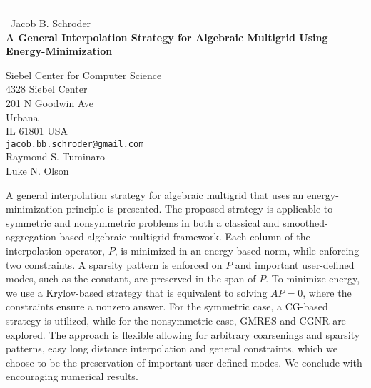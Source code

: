 \documentclass{report}
\begin{document}
\begin{center}
\rule{6in}{1pt} \
{\large Jacob B. Schroder \\
{\bf A General Interpolation Strategy for Algebraic Multigrid Using Energy-Minimization}}

Siebel Center for Computer Science \\ 4328 Siebel Center \\ 201 N Goodwin Ave \\ Urbana \\ IL 61801 USA
\\
{\tt jacob.bb.schroder@gmail.com}\\
Raymond S. Tuminaro\\
Luke N. Olson\end{center}

A general interpolation strategy for algebraic multigrid that uses an
energy-minimization principle is presented. The proposed strategy is
applicable to symmetric and nonsymmetric problems in both a classical and
smoothed-aggregation-based algebraic multigrid framework. Each column of
the interpolation operator, $P$, is minimized in an energy-based norm,
while enforcing two constraints. A sparsity pattern is enforced on $P$
and important user-defined modes, such as the constant, are preserved in
the span of $P$. To minimize energy, we use a Krylov-based strategy that
is equivalent to solving $A P = 0$, where the constraints ensure a
nonzero answer. For the symmetric case, a CG-based strategy is utilized,
while for the nonsymmetric case, GMRES and CGNR are explored. The
approach is flexible allowing for arbitrary coarsenings and sparsity
patterns, easy long distance interpolation and general constraints, which
we choose to be the preservation of important user-defined modes. We
conclude with encouraging numerical results.
\end{document}
